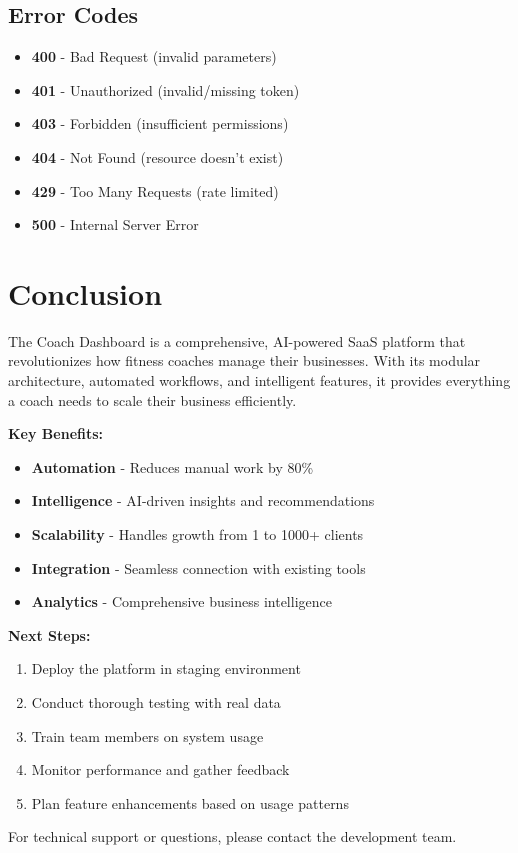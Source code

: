 \documentclass[12pt,a4paper]{article}
\begin{document}
\subsection{Error Codes}
\begin{itemize}
    \item \textbf{400} - Bad Request (invalid parameters)
    \item \textbf{401} - Unauthorized (invalid/missing token)
    \item \textbf{403} - Forbidden (insufficient permissions)
    \item \textbf{404} - Not Found (resource doesn't exist)
    \item \textbf{429} - Too Many Requests (rate limited)
    \item \textbf{500} - Internal Server Error
\end{itemize}

\section{Conclusion}

The Coach Dashboard is a comprehensive, AI-powered SaaS platform that revolutionizes how fitness coaches manage their businesses. With its modular architecture, automated workflows, and intelligent features, it provides everything a coach needs to scale their business efficiently.

\textbf{Key Benefits:}
\begin{itemize}
    \item \textbf{Automation} - Reduces manual work by 80\%
    \item \textbf{Intelligence} - AI-driven insights and recommendations
    \item \textbf{Scalability} - Handles growth from 1 to 1000+ clients
    \item \textbf{Integration} - Seamless connection with existing tools
    \item \textbf{Analytics} - Comprehensive business intelligence
\end{itemize}

\textbf{Next Steps:}
\begin{enumerate}
    \item Deploy the platform in staging environment
    \item Conduct thorough testing with real data
    \item Train team members on system usage
    \item Monitor performance and gather feedback
    \item Plan feature enhancements based on usage patterns
\end{enumerate}

For technical support or questions, please contact the development team.
\end{document}
